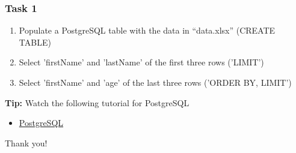 \documentclass{beamer}
\begin{document}
\begin{frame}
    \frametitle{Task 1}
    \begin{enumerate}
        \item Populate a PostgreSQL table with the data in “data.xlsx” (CREATE TABLE)
        \item Select 'firstName' and 'lastName' of the first three rows  ('LIMIT')
        \item Select 'firstName' and 'age' of the last three rows ('ORDER BY, LIMIT')
    \end{enumerate}
\vfill
\textbf{Tip:} Watch the following tutorial for PostgreSQL
\begin{itemize}
    \item \href{https://www.youtube.com/watch?v=xaWlS9HtWYw}{PostgreSQL}
\end{itemize}
\end{frame}

\begin{frame}
\Huge{\centerline{Thank you!}}
\end{frame}

\end{document}
